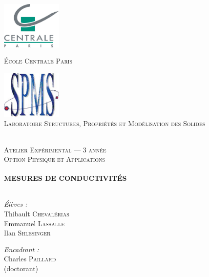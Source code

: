 
\begin{titlepage}

\begin{center}

\begin{minipage}[t]{0.48\textwidth}
  \begin{flushleft}
    \includegraphics [width=30mm]{images/ecp.jpg} \\[0.5cm]
    \begin{spacing}{1.5}
      \textsc{\'Ecole Centrale Paris}
    \end{spacing}
  \end{flushleft}
\end{minipage}
\begin{minipage}[t]{0.48\textwidth}
  \begin{flushright}
    \includegraphics [width=30mm]{images/spms.jpg} \\[0.5cm]
    \textsc{Laboratoire Structures, Propriétés et Modélisation
      des Solides}
  \end{flushright}
\end{minipage} \\[3cm]

\textsc{\Large Atelier Expérimental --- 3\ieme{} année \\Option Physique
et Applications}\\[0.5cm]
\HRule \\[0.4cm]
{\huge \bfseries MESURES DE CONDUCTIVIT\'ES}\\[0.4cm]
\HRule \\[1.3cm]

\begin{minipage}[t]{0.3\textwidth}
  \begin{flushleft} 
    \emph{\'Elèves :}\\
    Thibault \textsc{Chevalérias}\\
    Emmanuel \textsc{Lassalle}\\
    Ilan \textsc{Shlesinger}\\
  \end{flushleft}
\end{minipage}
\begin{minipage}[t]{0.6\textwidth}
  \begin{flushright} 
    \emph{Encadrant :} \\
    Charles \textsc{Paillard} \\(doctorant)\\
  \end{flushright}
\end{minipage}


\end{center}
\end{titlepage}
